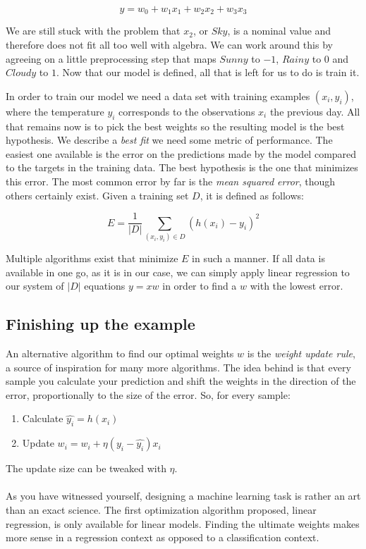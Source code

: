 $$ y = w_0 + w_1x_1 + w_2x_2 + w_3x_3 $$

We are still stuck with the problem that $x_2$, or $Sky$,
is a nominal value and therefore does not fit all too well with algebra.
We can work around this by agreeing on
a little preprocessing step
that maps $Sunny$ to $-1$, $Rainy$ to $0$ and $Cloudy$ to $1$.
Now that our model is defined, all that is left for us to do
is train it.

In order to train our model we need a data set with training examples
$(x_i, y_i)$,
where the temperature $y_i$ corresponds to
the observations $x_i$ the previous day.
All that remains now is to pick the best weights
so the resulting model is the best hypothesis.
We describe a \textit{best fit}
we need some metric of performance.
The easiest one available is the error on the predictions made by the model
compared to the targets in the training data.
The best hypothesis is the one that minimizes this error.
The most common error by far is the \textit{mean squared error},
though others certainly exist.
Given a training set $D$, it is defined as follows:

$$ E = \frac{1}{|D|} \sum_{(x_i, y_i) \in D}{(h(x_i) - y_i)^2} $$

Multiple algorithms exist that minimize $E$ in such a manner.
If all data is available in one go, as it is in our case,
we can simply apply linear regression to our system
of $|D|$ equations $y = xw$ in order to find a $w$
with the lowest error.



\subsection{Finishing up the example}
An alternative algorithm to find our optimal weights $w$
is the \textit{weight update rule},
a source of inspiration for many more algorithms.
The idea behind is that every sample
you calculate your prediction
and shift the weights in the direction of the error,
proportionally to the size of the error.
So, for every sample:
\begin{enumerate}
\item Calculate $\hat{y_i} = h(x_i)$
\item Update $w_i = w_i + \eta(y_i - \hat{y_i})x_i$
\end{enumerate}

The update size can be tweaked with $\eta$.

\paragraph{}
As you have witnessed yourself,
designing a machine learning task
is rather an art than an exact science.
The first optimization algorithm proposed,
linear regression,
is only available for linear models.
Finding the ultimate weights
makes more sense in a regression context
as opposed to a classification context.

